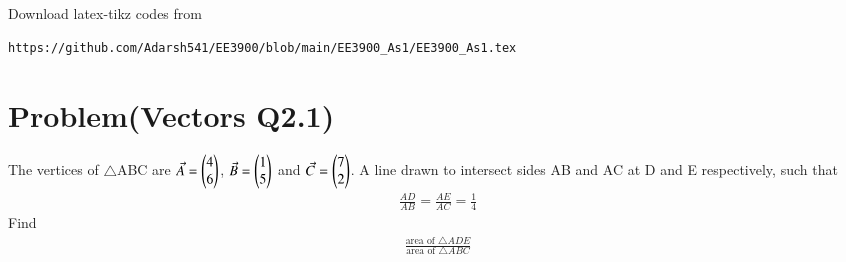 \documentclass[journal,12pt,twocolumn]{IEEEtran}
\begin{document}
%
Download latex-tikz codes from 
%
\begin{lstlisting}
https://github.com/Adarsh541/EE3900/blob/main/EE3900_As1/EE3900_As1.tex
\end{lstlisting}
\section{Problem(Vectors Q2.1)}
The vertices of $\triangle$ABC are $\Vec{A}=\begin{pmatrix}4\\6\end{pmatrix}$, $\Vec{B}=\begin{pmatrix}1\\5\end{pmatrix}$ and $\Vec{C}=\begin{pmatrix}7\\2\end{pmatrix}$. A line drawn to intersect sides AB and AC at D and E respectively, such that
\begin{align}
    \frac{AD}{AB}=\frac{AE}{AC}=\frac{1}{4}
\end{align}
Find 
\begin{align}
    \frac{\text{area of } \triangle ADE}{\text{area of } \triangle ABC}
\end{align}
\end{document}
